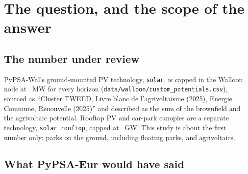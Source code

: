 \documentclass[11pt,a4paper]{article}
\begin{document}
\begin{abstract}
\textbf{The poor soils are mostly not poor.} The only regional map ranks soils
by percentiles of plant-available water and depth; its lowest classes are stony
loams that farmers crop wherever they can (\EvFarmedClassTwo{}\,\% of the land
available to them, more than the average soil). Removing the land in the LPIS
register and the gardens and farmyards, and weighting what is left by the
revealed agricultural use of its soil unit, leaves \EvRevealedWeightedHa{}~ha of
\EvMappedPoorHa{}.

\textbf{The number is decided by the farmland rule.} Raising the agrivoltaic
quota to 1\,\% gives \SAgriQuotaOneGW{}~GWc, to 2\,\% \SAgriQuotaTwoGW{}; every
eligible grassland parcel \SAgriGrasslandAllGW{}; every eligible parcel
\SAgriAllGW{}. Every other choice moves the reference by a few GWc at most
(\S{}\ref{sec:sensitivity}).

\textbf{For the model:} the \ModelCapGW{}~GW cap is not a land limit but a
policy assumption: it is what the reference gives with agrivoltaics on 2\,\% of
the agricultural area instead of 0.6\,\% (\S{}\ref{sec:model}).
\end{abstract}

\tableofcontents
\newpage

\section{The question, and the scope of the answer}\label{sec:question}

\subsection{The number under review}

PyPSA-Wal's ground-mounted PV technology, \texttt{solar}, is capped in the
Walloon node at \ModelCapMW{}~MW for every horizon
(\texttt{data/walloon/custom\_potentials.csv}), sourced as ``Cluster TWEED,
Livre blanc de l'agrivoltaïsme (2025), Energie Commune, Renouvelle (2025)'' and
described as the sum of the brownfield and the agrivoltaic potential. Rooftop PV
and car-park canopies are a separate technology, \texttt{solar rooftop}, capped
at \ModelRoofGW{}~GW. This study is about the first number only: parks on the
ground, including floating parks, and agrivoltaics.

\subsection{What PyPSA-Eur would have said}
\end{document}
